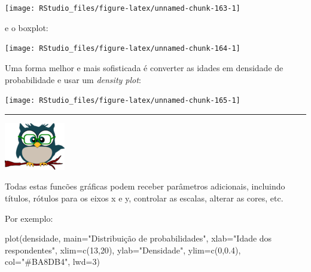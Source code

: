 \documentclass[
]{article}
\newenvironment{Shaded}{\begin{snugshade}}{\end{snugshade}}
\newcommand{\AttributeTok}[1]{\textcolor[rgb]{0.77,0.63,0.00}{#1}}
\newcommand{\DecValTok}[1]{\textcolor[rgb]{0.00,0.00,0.81}{#1}}
\newcommand{\FloatTok}[1]{\textcolor[rgb]{0.00,0.00,0.81}{#1}}
\newcommand{\FunctionTok}[1]{\textcolor[rgb]{0.00,0.00,0.00}{#1}}
\newcommand{\NormalTok}[1]{#1}
\newcommand{\OtherTok}[1]{\textcolor[rgb]{0.56,0.35,0.01}{#1}}
\newcommand{\SpecialCharTok}[1]{\textcolor[rgb]{0.00,0.00,0.00}{#1}}
\newcommand{\StringTok}[1]{\textcolor[rgb]{0.31,0.60,0.02}{#1}}
\begin{document}
\begin{center}\texttt{[image: RStudio\_files/figure-latex/unnamed-chunk-163-1]} \end{center}

e o boxplot:

\begin{Shaded}
\end{Shaded}

\begin{center}\texttt{[image: RStudio\_files/figure-latex/unnamed-chunk-164-1]} \end{center}

Uma forma melhor e mais sofisticada é converter as idades em densidade
de probabilidade e usar um \emph{density plot}:

\begin{Shaded}
\end{Shaded}

\begin{center}\texttt{[image: RStudio\_files/figure-latex/unnamed-chunk-165-1]} \end{center}

\begin{center}\rule{0.5\linewidth}{0.5pt}\end{center}

\begin{flushleft}\includegraphics[width=0.08\linewidth]{coruja} \end{flushleft}

Todas estas funcões gráficas podem receber parâmetros adicionais,
incluindo títulos, rótulos para os eixos x e y, controlar as escalas,
alterar as cores, etc.

Por exemplo:

\begin{Shaded}
\begin{Highlighting}[]
\FunctionTok{plot}\NormalTok{(densidade, }
     \AttributeTok{main=}\StringTok{"Distribuição de probabilidades"}\NormalTok{, }
     \AttributeTok{xlab=}\StringTok{"Idade dos respondentes"}\NormalTok{, }
     \AttributeTok{xlim=}\FunctionTok{c}\NormalTok{(}\DecValTok{13}\NormalTok{,}\DecValTok{20}\NormalTok{), }\AttributeTok{ylab=}\StringTok{"Densidade"}\NormalTok{, }\AttributeTok{ylim=}\FunctionTok{c}\NormalTok{(}\DecValTok{0}\NormalTok{,}\FloatTok{0.4}\NormalTok{), }
     \AttributeTok{col=}\StringTok{"\#BA8DB4"}\NormalTok{, }\AttributeTok{lwd=}\DecValTok{3}\NormalTok{)}
\end{Highlighting}
\end{Shaded}
\end{document}
